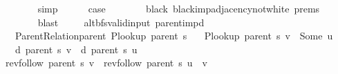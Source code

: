 \begin{isabellebody}
\ \ \ \ \ \ \isamarkupfalse%
\ simp{\isacharplus}{\kern0pt}\isanewline
\ \ \ \ \isamarkupfalse%
\ {\isacharquery}{\kern0pt}case\isanewline
\ \ \ \ \ \ \isamarkupfalse%
\ black\ black{\isacharunderscore}{\kern0pt}imp{\isacharunderscore}{\kern0pt}adjacency{\isacharunderscore}{\kern0pt}not{\isacharunderscore}{\kern0pt}white\ {\isachardoublequoteopen}{}{\isachardot}{\kern0pt}prems{\isachardoublequoteclose}{\isacharparenleft}{\kern0pt}{}{\isacharparenright}{\kern0pt}\isanewline
\ \ \ \ \ \ \isamarkupfalse%
\ blast\isanewline
\ \ \isamarkupfalse%
\isanewline
{}\isamarkupfalse%
%
\endisatagproof
{\isafoldproof}%
%
\isadelimproof
\isanewline
%
\endisadelimproof
\isanewline
{}\isamarkupfalse%
\ {\isacharparenleft}{\kern0pt}\ alt{\isacharunderscore}{\kern0pt}bfs{\isacharunderscore}{\kern0pt}valid{\isacharunderscore}{\kern0pt}input{\isacharparenright}{\kern0pt}\ parent{\isacharunderscore}{\kern0pt}imp{\isacharunderscore}{\kern0pt}d{\isacharcolon}{\kern0pt}\isanewline
\ \ \ {\isachardoublequoteopen}Parent{\isacharunderscore}{\kern0pt}Relation{\isachardot}{\kern0pt}parent\ {\isacharparenleft}{\kern0pt}P{\isacharunderscore}{\kern0pt}lookup\ {\isacharparenleft}{\kern0pt}parent\ s{\isacharparenright}{\kern0pt}{\isacharparenright}{\kern0pt}{\isachardoublequoteclose}\isanewline
\ \ \ {\isachardoublequoteopen}P{\isacharunderscore}{\kern0pt}lookup\ {\isacharparenleft}{\kern0pt}parent\ s{\isacharparenright}{\kern0pt}\ v\ {\isacharequal}{\kern0pt}\ Some\ u{\isachardoublequoteclose}\isanewline
\ \ \ {\isachardoublequoteopen}d\ {\isacharparenleft}{\kern0pt}parent\ s{\isacharparenright}{\kern0pt}\ v\ {\isacharequal}{\kern0pt}\ d\ {\isacharparenleft}{\kern0pt}parent\ s{\isacharparenright}{\kern0pt}\ u\ {\isacharplus}{\kern0pt}\ {}{\isachardoublequoteclose}\isanewline
%
\isadelimproof
%
\endisadelimproof
%
\isatagproof
{}\isamarkupfalse%
\ {\isacharminus}{\kern0pt}\isanewline
\ \ \isamarkupfalse%
\ {\isachardoublequoteopen}rev{\isacharunderscore}{\kern0pt}follow\ {\isacharparenleft}{\kern0pt}parent\ s{\isacharparenright}{\kern0pt}\ v\ {\isacharequal}{\kern0pt}\ rev{\isacharunderscore}{\kern0pt}follow\ {\isacharparenleft}{\kern0pt}parent\ s{\isacharparenright}{\kern0pt}\ u\ {\isacharat}{\kern0pt}\ {\isacharbrackleft}{\kern0pt}v{\isacharbrackright}{\kern0pt}{\isachardoublequoteclose}\isanewline
\ \ \ \ \isamarkupfalse%

\end{isabellebody}
